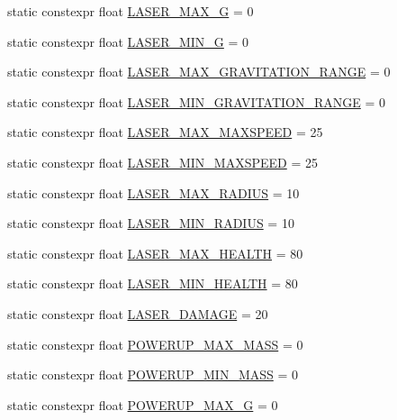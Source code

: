 \begin{DoxyCompactItemize}
\item 
static constexpr float \hyperlink{class_act_conf_a6beb7023724c462dde4759b1d9b71523}{L\+A\+S\+E\+R\+\_\+\+M\+A\+X\+\_\+\+G} = 0
\item 
static constexpr float \hyperlink{class_act_conf_a544a1db0e9d6f7460b9e830454bb7c6e}{L\+A\+S\+E\+R\+\_\+\+M\+I\+N\+\_\+\+G} = 0
\item 
static constexpr float \hyperlink{class_act_conf_a43c5e26c88265b38ad7d511aaee09943}{L\+A\+S\+E\+R\+\_\+\+M\+A\+X\+\_\+\+G\+R\+A\+V\+I\+T\+A\+T\+I\+O\+N\+\_\+\+R\+A\+N\+G\+E} = 0
\item 
static constexpr float \hyperlink{class_act_conf_a69be0267b8fee7cc2402284ef993c088}{L\+A\+S\+E\+R\+\_\+\+M\+I\+N\+\_\+\+G\+R\+A\+V\+I\+T\+A\+T\+I\+O\+N\+\_\+\+R\+A\+N\+G\+E} = 0
\item 
static constexpr float \hyperlink{class_act_conf_a9ffd4194046774f1aab2f478dabbd71d}{L\+A\+S\+E\+R\+\_\+\+M\+A\+X\+\_\+\+M\+A\+X\+S\+P\+E\+E\+D} = 25
\item 
static constexpr float \hyperlink{class_act_conf_abb2a1192a6fda9c96c16958a4be49380}{L\+A\+S\+E\+R\+\_\+\+M\+I\+N\+\_\+\+M\+A\+X\+S\+P\+E\+E\+D} = 25
\item 
static constexpr float \hyperlink{class_act_conf_a1390b199da20ff11340cf353c75214d9}{L\+A\+S\+E\+R\+\_\+\+M\+A\+X\+\_\+\+R\+A\+D\+I\+U\+S} = 10
\item 
static constexpr float \hyperlink{class_act_conf_a82640220f6656034ee26ad49a2b73b9a}{L\+A\+S\+E\+R\+\_\+\+M\+I\+N\+\_\+\+R\+A\+D\+I\+U\+S} = 10
\item 
static constexpr float \hyperlink{class_act_conf_a536a950abcd330987f54791a57ccccb1}{L\+A\+S\+E\+R\+\_\+\+M\+A\+X\+\_\+\+H\+E\+A\+L\+T\+H} = 80
\item 
static constexpr float \hyperlink{class_act_conf_ae02d18076a07bf6059bf6df5dffe4fd1}{L\+A\+S\+E\+R\+\_\+\+M\+I\+N\+\_\+\+H\+E\+A\+L\+T\+H} = 80
\item 
static constexpr float \hyperlink{class_act_conf_a1f29a01198277a3c0cfeb8226b9c0ab2}{L\+A\+S\+E\+R\+\_\+\+D\+A\+M\+A\+G\+E} = 20
\item 
static constexpr float \hyperlink{class_act_conf_ae478e5bb4115c0a92915029f3a601ec8}{P\+O\+W\+E\+R\+U\+P\+\_\+\+M\+A\+X\+\_\+\+M\+A\+S\+S} = 0
\item 
static constexpr float \hyperlink{class_act_conf_a158916d4ae5c59ead3bc818deccc270c}{P\+O\+W\+E\+R\+U\+P\+\_\+\+M\+I\+N\+\_\+\+M\+A\+S\+S} = 0
\item 
static constexpr float \hyperlink{class_act_conf_a8fbd08c18f70df5af43e85ef4920cdba}{P\+O\+W\+E\+R\+U\+P\+\_\+\+M\+A\+X\+\_\+\+G} = 0

\end{DoxyCompactItemize}
